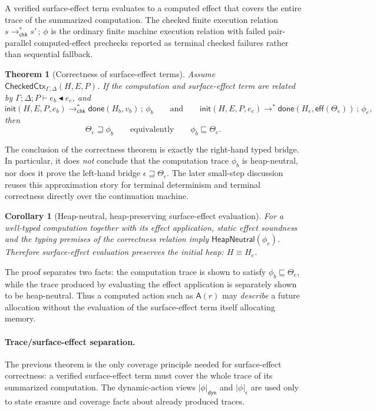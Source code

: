 \documentclass[10pt,a4paper]{article}
\newcommand{\desc}{\mathrel{\blacktriangleleft}}      %
\newcommand{\approxx}{\mathrel{\sqsubseteq}}          %
\newcommand{\As}{\mathsf{A}}
\newcommand{\HeapNeutral}{\mathsf{HeapNeutral}}
\newcommand{\dynset}[1]{\lvert #1\rvert_{\mathsf{dyn}}}
\newcommand{\staticset}[1]{\lvert #1\rvert_{\epsilon}}
\newcommand{\covers}{\mathrel{\sqsupseteq}}
\newcommand{\chksteps}{\mathrel{\longrightarrow^{*}_{\mathsf{chk}}}}
\newtheorem{theorem}{Theorem}
\newtheorem{corollary}{Corollary}
\begin{document}
\noindent A verified surface-effect term evaluates to a computed
effect that covers the entire trace of the summarized computation. The checked
finite execution relation $s\chksteps s'\,;\,\phi$ is the ordinary finite
machine execution relation with failed pair-parallel computed-effect prechecks
reported as terminal checked failures rather than sequential fallback.

\begin{theorem}[Correctness of surface-effect terms]
\label{thm:surface-effect-correctness}
Assume $\mathsf{CheckedCtx}_{\Gamma,\Delta}(H,E,P)$. If the computation and
surface-effect term are related by
$\Gamma;\Delta;P \vdash e_b \desc e_e$, and
\[
\mathsf{init}(H,E,P,e_b)\chksteps\mathsf{done}(H_b,v_b)\,;\,\phi_b
\qquad\text{and}\qquad
\mathsf{init}(H,E,P,e_e)\longrightarrow^{*}
  \mathsf{done}(H_e,\mathsf{eff}(\Theta_e))\,;\,\phi_e,
\]
then
\[
\Theta_e\covers\phi_b
\qquad\text{equivalently}\qquad
\phi_b \approxx \Theta_e.
\]
\end{theorem}

The conclusion of the correctness theorem is exactly the right-hand typed
bridge. In particular, it does \emph{not} conclude that the computation trace
$\phi_b$ is heap-neutral, nor does it prove the left-hand bridge
$\epsilon\covers\Theta_e$. The later small-step discussion reuses this
approximation story for terminal determinism and terminal correctness directly
over the continuation machine.

\begin{corollary}[Heap-neutral, heap-preserving surface-effect evaluation]
For a well-typed computation together with its effect application, static effect
soundness and the typing premises of the correctness relation imply
$\HeapNeutral(\phi_e)$. Therefore surface-effect evaluation preserves the initial heap:
$H \equiv H_e$.
\end{corollary}

The proof separates two facts: the computation trace is shown to satisfy
$\phi_b \approxx \Theta_e$, while the trace produced by evaluating the effect
application is separately shown to be heap-neutral. Thus a computed action such as
$\As(r)$ may \emph{describe} a future allocation without the evaluation of the
surface-effect term itself allocating memory.

\paragraph{Trace/surface-effect separation.}
The previous theorem is the only coverage principle needed for surface-effect
correctness: a verified surface-effect term must cover the whole trace of its
summarized computation.  The dynamic-action views $\dynset{\phi}$ and
$\staticset{\phi}$ are used only to state erasure and coverage facts about
already produced traces.
\end{document}

